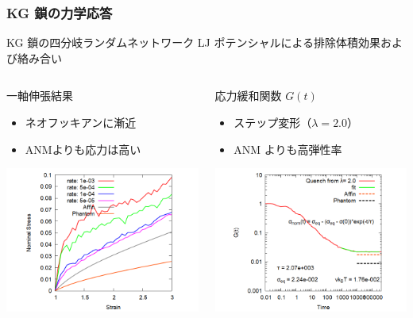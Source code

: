 \documentclass[aspectratio=169,11pt, dvipdfmx]{beamer}
\begin{document}
\begin{frame}
	\frametitle{KG 鎖の力学応答}
	\vspace{-3mm}
	\begin{alertblock}{KG 鎖の四分岐ランダムネットワーク}
		LJ ポテンシャルによる排除体積効果および絡み合い
	\end{alertblock}
	\vspace{-4mm}
	\begin{columns}[T, onlytextwidth]
			\begin{block}{一軸伸張結果}
				\begin{itemize}
					\item ネオフッキアンに漸近
					\item ANMよりも応力は高い
				\end{itemize}
                \centering
				\includegraphics[width=.75\textwidth]{N48_C4_M3.png}
			\end{block}
			
			\begin{block}{応力緩和関数 $G(t)$}
				\begin{itemize}
					\item ステップ変形（$\lambda=2.0$）
					\item ANM よりも高弾性率
				\end{itemize}
                \centering
				\includegraphics[width=.75\textwidth]{gt_N48_C4_M3.png}
			\end{block}
	\end{columns}
\end{frame}
\end{document}

